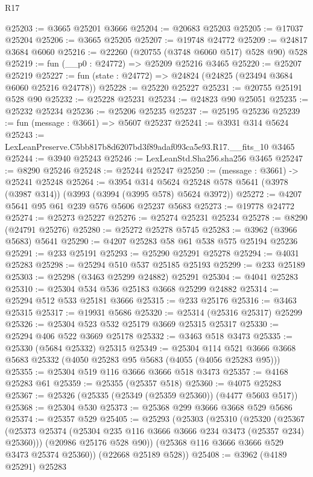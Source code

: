 \begin{lexlean}{R17}
\begin{coremodule}
@25203 := @3665 @25201 @3666
@25204 := @20683 @25203
@25205 := @17037 @25204
@25206 := @3665 @25205
@25207 := @19748 @24772
@25209 := @24817 @3684 @6060
@25216 := @22260 (@20755 (@3748 @6060 @517) @528 @90) @528
@25219 := fun (__p0 : @24772) => @25209 @25216 @3465
@25220 := @25207 @25219
@25227 := fun (state : @24772) => @24824 (@24825 (@23494 @3684 @6060 @25216 @24778))
@25228 := @25220 @25227
@25231 := @20755 @25191 @528 @90
@25232 := @25228 @25231
@25234 := @24823 @90 @25051
@25235 := @25232 @25234
@25236 := @25206 @25235
@25237 := @25195 @25236
@25239 := fun (message : @3661) => @5607 @25237
@25241 := @3931 @314 @5624
@25243 := LexLeanPreserve.C5bb817b8d6207bd3f89adaf093ca5e93.R17.__fits_10 @3465
@25244 := @3940 @25243
@25246 := LexLeanStd.Sha256.sha256 @3465
@25247 := @8290 @25246
@25248 := @25244 @25247
@25250 := (message : @3661) -> @25241 @25248
@25264 := @3954
    @314
    @5624
    @25248
    @578
    @5641
    (@3978 (@3987 @314))
    (@3993 (@3994 (@3995 @578) @5624 @3972))
@25272 := @4207 @5641 @95 @61 @239 @576 @5606 @25237 @5683
@25273 := @19778 @24772
@25274 := @25273 @25227
@25276 := @25274 @25231 @25234
@25278 := @8290 (@24791 @25276)
@25280 := @25272 @25278 @5745
@25283 := @3962 (@3966 @5683) @5641
@25290 := @4207 @25283 @58 @61 @538 @575 @25194 @25236
@25291 := @233 @25191
@25293 := @25290 @25291 @25278
@25294 := @4031 @25283
@25298 := @25294 @510 @537 @25185 @25193
@25299 := @233 @25189
@25303 := @25298 (@3463 @25299 @24882) @25291
@25304 := @4041 @25283
@25310 := @25304 @534 @536 @25183 @3668 @25299 @24882
@25314 := @25294 @512 @533 @25181 @3666
@25315 := @233 @25176
@25316 := @3463 @25315
@25317 := @19931 @5686
@25320 := @25314 (@25316 @25317) @25299
@25326 := @25304 @523 @532 @25179 @3669 @25315 @25317
@25330 := @25294 @406 @522 @3669 @25178
@25332 := @3463 @518 @3473
@25335 := @25330 (@5684 @25332) @25315
@25349 := @25304
    @114
    @521
    @3666
    @3668
    @5683
    @25332
    (@4050 @25283 @95 @5683 (@4055 (@4056 @25283 @95)))
@25355 := @25304 @519 @116 @3666 @3666 @518 @3473
@25357 := @4168 @25283 @61
@25359 := @25355 (@25357 @518)
@25360 := @4075 @25283
@25367 := @25326 (@25335 (@25349 (@25359 @25360)) (@4477 @5603 @517))
@25368 := @25304 @530
@25373 := @25368 @299 @3666 @3668 @529 @5686
@25374 := @25357 @529
@25405 := @25293
    (@25303
      (@25310
        (@25320
          (@25367 (@25373 @25374 (@25304 @235 @116 @3666 @3666 @234 @3473 (@25357 @234) @25360)))
          (@20986 @25176 @528 @90))
        (@25368 @116 @3666 @3666 @529 @3473 @25374 @25360))
      (@22668 @25189 @528))
@25408 := @3962 (@4189 @25291) @25283

\end{coremodule}
\end{lexlean}
